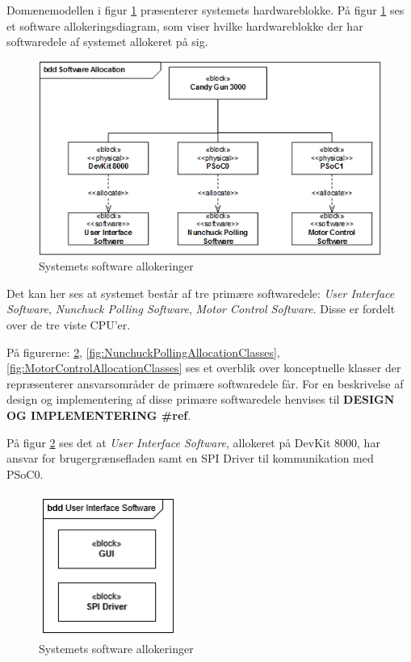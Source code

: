 Domænemodellen i figur \ref{figure:allocationDiagram} præsenterer systemets hardwareblokke. På figur \ref{figure:allocationDiagram} ses et software allokeringsdiagram, som viser hvilke hardwareblokke der har softwaredele af systemet allokeret på sig. 

\begin{figure}[H]
	\centering
	\includegraphics[width=\textwidth]{SystemArkitektur/images/SoftwareAllocation.PNG}
	\caption{Systemets software allokeringer}
	\label{figure:allocationDiagram}
\end{figure}

Det kan her ses at systemet består af tre primære softwaredele: \textit{User Interface Software}, \textit{Nunchuck Polling Software}, \textit{Motor Control Software}. Disse er fordelt over de tre viste CPU'er.

På figurerne: \ref{fig:UserInterfaceAllocationClasses}, \ref{fig:NunchuckPollingAllocationClasses}, \ref{fig:MotorControlAllocationClasses} ses et overblik over konceptuelle klasser der repræsenterer ansvarsområder de primære softwaredele får. For en beskrivelse af design og implementering af disse primære softwaredele henvises til \textbf{DESIGN OG IMPLEMENTERING \#ref}.

På figur \ref{fig:UserInterfaceAllocationClasses} ses det at \textit{User Interface Software}, allokeret på DevKit 8000, har ansvar for brugergrænsefladen samt en SPI Driver til kommunikation med PSoC0. 

\begin{figure}[H]
	\centering
	\includegraphics[width=0.4\textwidth]{SystemArkitektur/images/UserInterfaceAllocationClasses.PNG}
	\caption{Systemets software allokeringer}
	\label{fig:UserInterfaceAllocationClasses}
\end{figure}

